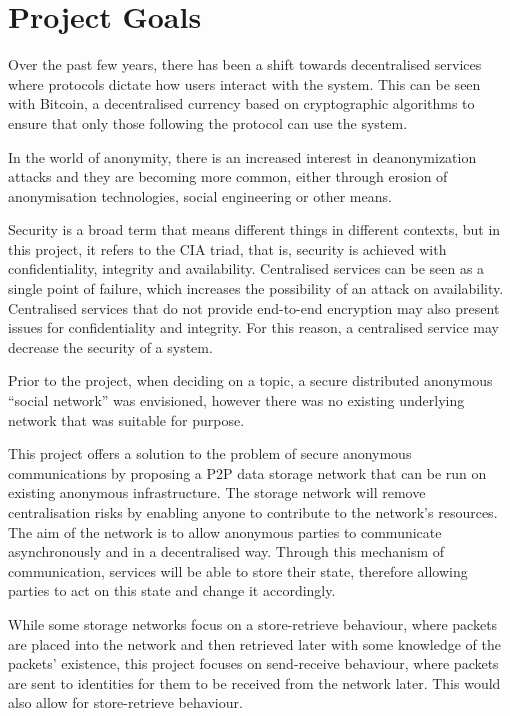 \section{Project Goals}
	Over the past few years, there has been a shift towards decentralised services where protocols dictate how users interact with the system. This can be seen with Bitcoin, a decentralised currency based on cryptographic algorithms  to ensure that only those following the protocol can use the system.
	
	
	In the world of anonymity, there is an increased interest in deanonymization attacks and they are becoming more common, either through erosion of anonymisation technologies, social engineering or other means.
	
	Security is a broad term that means different things in different contexts, but in this project, it refers to the CIA triad, that is, security is achieved with confidentiality, integrity and availability. Centralised services can be seen as a single point of failure, which increases the possibility of an attack on availability. Centralised services that do not provide end-to-end encryption may also present issues for confidentiality and integrity. For this reason, a centralised service may decrease the security of a system.
	
	Prior to the project, when deciding on a topic, a secure distributed anonymous ``social network'' was envisioned, however there was no existing underlying network that was suitable for purpose.
	
	This project offers a solution to the problem of secure anonymous communications by proposing a P2P data storage network that can be run on existing anonymous infrastructure. The storage network will remove centralisation risks by enabling anyone to contribute to the network's resources. The aim of the network is to allow anonymous parties to communicate asynchronously and in a decentralised way. Through this mechanism of communication, services will be able to store their state, therefore allowing parties to act on this state and change it accordingly.
	
	While some storage networks focus on a store-retrieve behaviour, where packets are placed into the network and then retrieved later with some knowledge of the packets' existence, this project focuses on send-receive behaviour, where packets are sent to identities for them to be received from the network later. This would also allow for store-retrieve behaviour. 
	
